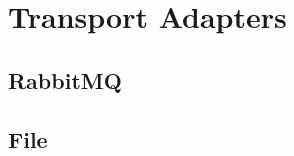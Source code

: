 \documentclass[paper=letter,titlepage,captions=tableheading]{scrartcl}
\begin{document}
\section{Transport Adapters}
\label{sec:transport}


\subsection{RabbitMQ}
\label{subsec:rabbitmq}



\subsection{File}
\label{subsec:file}


\end{document}
